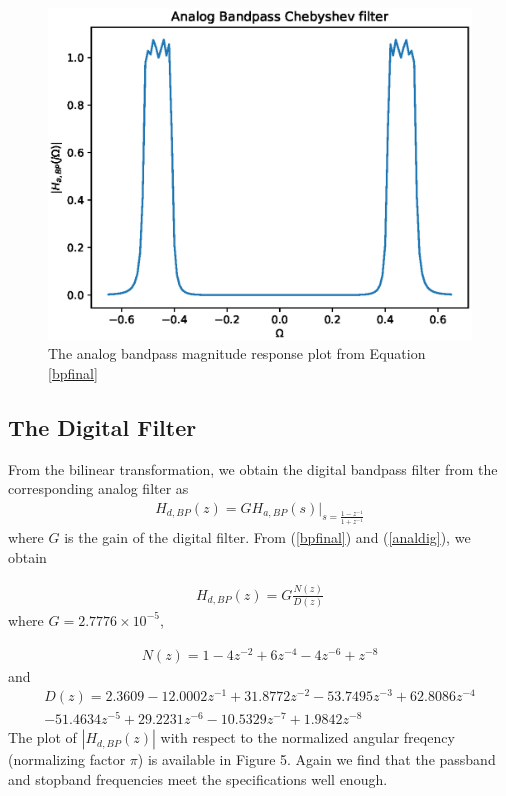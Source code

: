 \documentclass{article}
\begin{document}
\begin{figure}
\label{fig4}
\includegraphics[width = 15cm]{./codes/iir/figs/ee18btech11012_IIR_Bandpass.eps}
\caption{The analog bandpass magnitude response plot from Equation \ref{bpfinal}} 
\end{figure}

\subsection{The Digital Filter}
From the bilinear transformation, we obtain the digital bandpass filter from the corresponding analog filter as
\begin{eqnarray}
\label{analdig}
H_{d,BP}(z) = GH_{a,BP}(s)\vert_{s = \frac{1-z^{-1}}{1 + z^{-1}}}
\end{eqnarray}
where $G$ is the gain of the digital filter.  From (\ref{bpfinal}) and (\ref{analdig}), we obtain

\begin{eqnarray}
H_{d,BP}(z) = G \frac{N(z)}{D(z)}
\end{eqnarray}
where $G = 2.7776 \times 10^{-5}$,

\begin{eqnarray}
N(z)=  1 - 4 z^{-2} + 6 z^{-4} - 4z^{-6} + z^{-8} 
\end{eqnarray}
and
\begin{eqnarray}
D(z) = 2.3609  -12.0002z^{-1} + 31.8772z^{-2}  -53.7495z^{-3}+  62.8086z^{-4}\nonumber \\
  -51.4634z^{-5}+   29.2231z^{-6}  -10.5329z^{-7} +   1.9842z^{-8}
\end{eqnarray}
The plot of $|H_{d,BP}(z)|$ with respect to the normalized angular freqency (normalizing factor $\pi$) is available in Figure 5.  Again we
find that the passband and stopband frequencies meet the specifications well enough.
\end{document}
